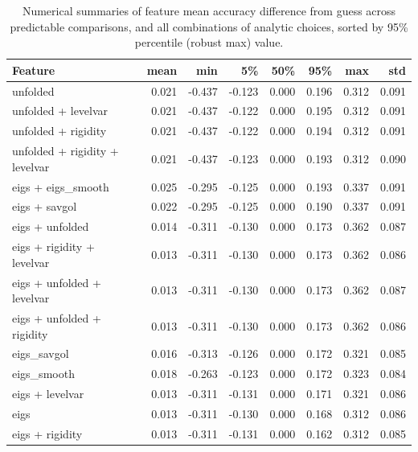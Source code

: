 \documentclass{article}  %
\begin{document}
\begin{table}[H]
\caption{Numerical summaries of feature mean accuracy difference from guess across predictable comparisons, and all combinations of
analytic choices, sorted by 95\% percentile (robust max) value.}
\label{tab:acc-numerical}
\small
\centering

\begin{tabular}{lrrrrrrr}
\hline
Feature &      mean &       min &        5\% &       50\% &       95\% &       max &       std \\
\hline
unfolded                       &  0.021 & -0.437 & -0.123 &  0.000 &  0.196 &  0.312 &  0.091 \\
unfolded + levelvar            &  0.021 & -0.437 & -0.122 &  0.000 &  0.195 &  0.312 &  0.091 \\
unfolded + rigidity            &  0.021 & -0.437 & -0.122 &  0.000 &  0.194 &  0.312 &  0.091 \\
unfolded + rigidity + levelvar &  0.021 & -0.437 & -0.123 &  0.000 &  0.193 &  0.312 &  0.090 \\
eigs + eigs\_smooth             &  0.025 & -0.295 & -0.125 &  0.000 &  0.193 &  0.337 &  0.091 \\
eigs + savgol                  &  0.022 & -0.295 & -0.125 &  0.000 &  0.190 &  0.337 &  0.091 \\
eigs + unfolded                &  0.014 & -0.311 & -0.130 &  0.000 &  0.173 &  0.362 &  0.087 \\
eigs + rigidity + levelvar     &  0.013 & -0.311 & -0.130 &  0.000 &  0.173 &  0.362 &  0.086 \\
eigs + unfolded + levelvar     &  0.013 & -0.311 & -0.130 &  0.000 &  0.173 &  0.362 &  0.087 \\
eigs + unfolded + rigidity     &  0.013 & -0.311 & -0.130 &  0.000 &  0.173 &  0.362 &  0.086 \\
eigs\_savgol                    &  0.016 & -0.313 & -0.126 &  0.000 &  0.172 &  0.321 &  0.085 \\
eigs\_smooth                    &  0.018 & -0.263 & -0.123 &  0.000 &  0.172 &  0.323 &  0.084 \\
eigs + levelvar                &  0.013 & -0.311 & -0.131 &  0.000 &  0.171 &  0.321 &  0.086 \\
eigs                           &  0.013 & -0.311 & -0.130 &  0.000 &  0.168 &  0.312 &  0.086 \\
eigs + rigidity                &  0.013 & -0.311 & -0.131 &  0.000 &  0.162 &  0.312 &  0.085 \\

\end{tabular}
\end{table}
\end{document}

